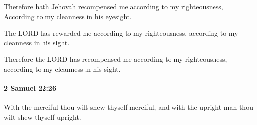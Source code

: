 			\begin{versebox}
					\item[BHS] 
					\item[ASV] Therefore hath Jehovah recompensed me according to my righteousness, According to my cleanness in his eyesight.
					\item[NIV] The LORD has rewarded me according to my righteousness, according to my cleanness in his sight.
					\item[NRSV] Therefore the LORD has recompensed me according to my righteousness, according to my cleanness in his sight.
			\end{versebox}

		\paragraph{2 Samuel 22:26} %
			\label{2SAMUEL-22-26}

			With the merciful thou wilt shew thyself merciful, and with the upright man thou wilt shew thyself upright.

